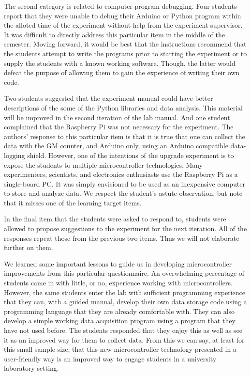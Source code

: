 The second category is related to computer program debugging.
Four students report that they were unable to debug their Arduino or Python program within the alloted time of the experiment without help from the experiment supervisor.
It was difficult to directly address this particular item in the middle of the semester.
Moving forward, it would be best that the instructions recommend that the students attempt to write the programs prior to starting the experiment or to supply the students with a known working software.
Though, the latter would defeat the purpose of allowing them to gain the experience of writing their own code.

Two students suggested that the experiment manual could have better descriptions of the some of the Python libraries and data analysis.
This material will be improved in the second iteration of the lab manual.
And one student complained that the Raspberry Pi was not necessary for the experiment.
The authors' response to this particular item is that it is true that one can collect the data with the GM counter, and Arduino only, using an Arduino compatible data-logging shield.
However, one of the intentions of the upgrade experiment is to expose the students to multiple microcontroller technologies.
Many experimenters, scientists, and electronics enthusiasts use the Raspberry Pi as a single-board PC.
It was simply envisioned to be used as an inexpensive computer to store and analyze data.
We respect the student's astute observation, but note that it misses one of the learning target items.

In the final item that the students were asked to respond to, students were allowed to propose suggestions to the experiment for the next iteration.
All of the responses repeat those from the previous two items. Thus we will not elaborate further on them.

We learned some important lessons to guide us in developing microcontroller improvements from this particular questionnaire.
An overwhelming percentage of students came in with little, or no, experience working with microcontrollers.
However, the same students enter the lab with sufficient programming experience that they can, with a guided manual, develop their own data storage code using a programming language that they are already comfortable with.
They can also develop a simple working data acquisition program using a program that they have not used before.
The students responded that they enjoy this as well as see it as an improved way for them to collect data.
From this we can say, at least for this small sample size, that this new microcontroller technology presented in a user-friendly way is an improved way to engage students in a university laboratory setting.

